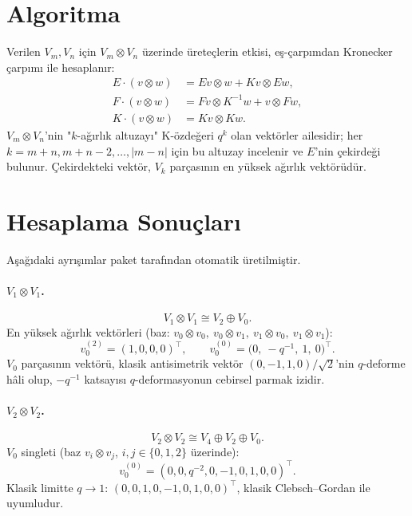 \documentclass[12pt,a4paper,fleqn]{report}
\newcommand{\normalsemi}{;}
\newcommand{\normalsemi}{\begingroup\semicolonfont;\endgroup}
\numberwithin{equation}{chapter}
\theoremstyle{plain}
\theoremstyle{definition}
\newcommand{\hwt}{v_0}
\begin{document}
\section{Algoritma}

Verilen $V_m, V_n$ için $V_m \otimes V_n$ üzerinde üreteçlerin etkisi,
eş-çarpımdan Kronecker çarpımı ile hesaplanır:
\begin{equation}
\begin{aligned}
  E \cdot (v \otimes w) &= E v \otimes w + K v \otimes E w, \\
  F \cdot (v \otimes w) &= F v \otimes K^{-1} w + v \otimes F w, \\
  K \cdot (v \otimes w) &= K v \otimes K w.
\end{aligned}
\end{equation}
$V_m \otimes V_n$'nin "$k$-ağırlık altuzayı" K-özdeğeri $q^k$ olan
vektörler ailesidir\normalsemi{} her $k = m+n, m+n-2, \dots, |m-n|$ için bu altuzay
incelenir ve $E$'nin çekirdeği bulunur. Çekirdekteki vektör, $V_k$
parçasının en yüksek ağırlık vektörüdür.

\section{Hesaplama Sonuçları}

Aşağıdaki ayrışımlar paket tarafından otomatik üretilmiştir.

\paragraph{$V_1 \otimes V_1$.}
\[
  V_1 \otimes V_1 \cong V_2 \oplus V_0.
\]
En yüksek ağırlık vektörleri (baz: $v_0\!\otimes\! v_0,\ v_0\!\otimes\! v_1,\ v_1\!\otimes\! v_0,\ v_1\!\otimes\! v_1$):
\[
  \hwt^{(2)} = (1, 0, 0, 0)^\top, \qquad
  \hwt^{(0)} = \big(0,\ -q^{-1},\ 1,\ 0\big)^\top.
\]
$V_0$ parçasının vektörü, klasik antisimetrik vektör
$(0, -1, 1, 0)/\sqrt{2}$'nin $q$-deforme hâli olup, $-q^{-1}$ katsayısı
$q$-deformasyonun cebirsel parmak izidir.

\paragraph{$V_2 \otimes V_2$.}
\[
  V_2 \otimes V_2 \cong V_4 \oplus V_2 \oplus V_0.
\]
$V_0$ singleti (baz $v_i \otimes v_j$, $i,j \in \{0,1,2\}$ üzerinde):
\[
  \hwt^{(0)} = (0, 0, q^{-2}, 0, -1, 0, 1, 0, 0)^\top.
\]
Klasik limitte $q \to 1$: $(0,0,1,0,-1,0,1,0,0)^\top$, klasik
Clebsch--Gordan ile uyumludur.
\end{document}
